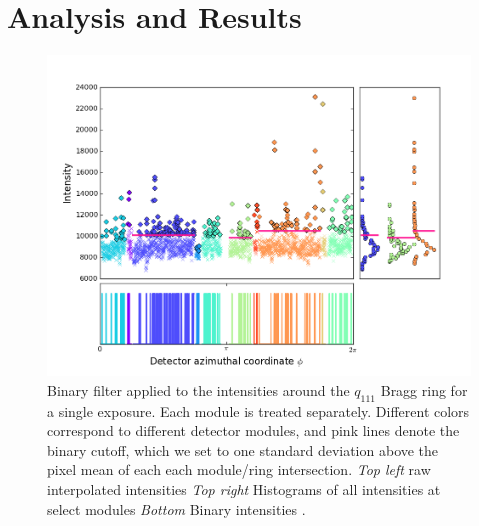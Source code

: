 \documentclass[a4paper,12pt]{article}
\begin{document}
\section*{Analysis and Results}
\begin{figure}
\centering
\includegraphics[scale=0.6]{./figure_BINARY.png}
	\caption[font=small]{ Binary filter applied to the intensities around the $q_{111}$ Bragg ring for a single exposure. Each module is treated separately. Different colors correspond to different detector modules, and pink lines denote the binary cutoff, which we set to one standard deviation above the pixel mean of each each module/ring intersection. \emph{Top left} raw interpolated intensities \emph{Top right} Histograms of all intensities at select modules \emph{Bottom} Binary intensities . }
\label{BINARY}
\end{figure}
\end{document}
